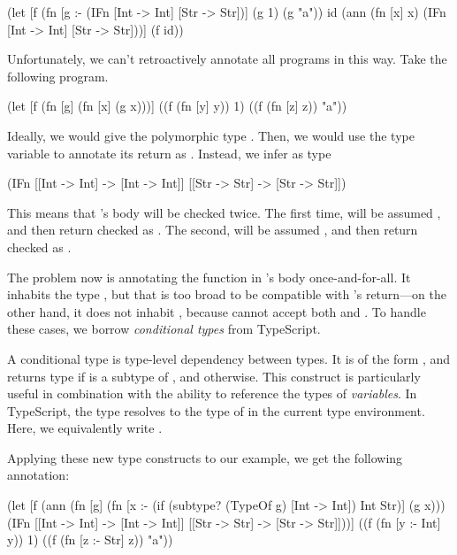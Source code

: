 \begin{cljlisting}
(let [f (fn [g :- (IFn [Int -> Int] [Str -> Str])]
          (g 1)
          (g "a"))
      id (ann (fn [x] x)
              (IFn [Int -> Int] [Str -> Str]))]
  (f id))
\end{cljlisting}

Unfortunately, we can't retroactively annotate all programs in this way.
Take the following program.

\begin{cljlisting}
(let [f (fn [g]
          (fn [x]
            (g x)))]
  ((f (fn [y] y)) 1)
  ((f (fn [z] z)) "a"))
\end{cljlisting}

Ideally, we would give  the polymorphic type
.
Then, we would use the type variable to annotate its return
as \clj{[a -> a]}.
Instead, we infer  as type

\begin{cljlisting}
(IFn [[Int -> Int] -> [Int -> Int]]
     [[Str -> Str] -> [Str -> Str]])
\end{cljlisting}

This means that 's body will be checked twice.
The first time,  will be assumed ,
and then return checked as .
The second,  will be assumed ,
and then return checked as .

The problem now is annotating the function in 's body once-and-for-all.
It inhabits the type ,
but that is too broad to be compatible with 's return---on the other hand,
it does not inhabit ,
because  cannot accept both  and .
To handle these cases, we borrow \emph{conditional types} from TypeScript.

A conditional type is type-level dependency between types.
It is of the form ,
and returns type  if  is a subtype of ,
and  otherwise.
This construct is particularly useful in combination with
the ability to reference the types of \emph{variables}.
In TypeScript, the type  resolves to the type of 
in the current type environment. Here, we equivalently write .

Applying these new type constructs to our example, we get the following annotation:

\begin{cljlisting}
(let [f (ann (fn [g]
               (fn [x :- (if (subtype? (TypeOf g) [Int -> Int]) Int Str)]
                 (g x)))
             (IFn [[Int -> Int] -> [Int -> Int]]
                  [[Str -> Str] -> [Str -> Str]]))]
  ((f (fn [y :- Int] y)) 1)
  ((f (fn [z :- Str] z)) "a"))
\end{cljlisting}

